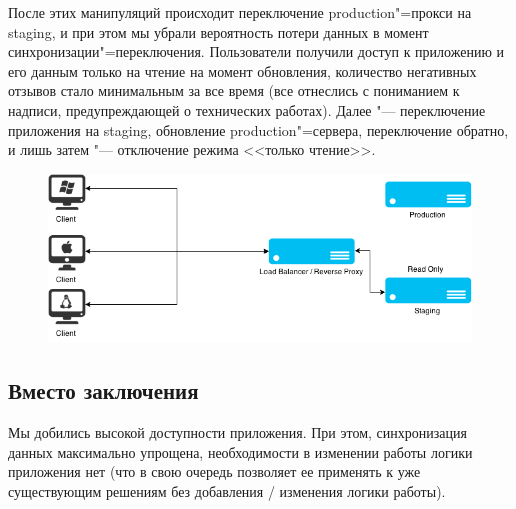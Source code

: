\documentclass[10pt, a5paper]{article}
\begin{document}
После этих манипуляций происходит переключение production"=прокси на staging, и при этом мы убрали вероятность потери данных в момент синхронизации"=переключения. Пользователи получили доступ к приложению и его данным только на чтение на момент обновления, количество негативных отзывов стало минимальным за все время (все отнеслись с пониманием к надписи, предупреждающей о технических работах). Далее "--- переключение приложения на staging, обновление production"=сервера, переключение обратно, и лишь затем "--- отключение режима <<только чтение>>.

\begin{figure}[h!]
  \centering
  \includegraphics[scale=0.36]{02_2015_10_readonly_work_on_stage}
\end{figure}

\subsection*{Вместо заключения}

Мы добились высокой доступности приложения. При этом, синхронизация данных максимально упрощена, необходимости в изменении работы логики приложения нет (что в свою очередь позволяет ее применять к уже существующим решениям без добавления / изменения логики работы).
\end{document}
